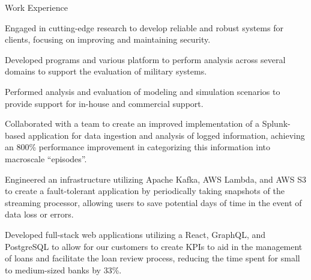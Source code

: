 \documentclass{resume} %
\begin{document}

\begin{workSection}{Work Experience}
    \experienceItem[
        company=Georgia Tech Research Institute (GTRI),
        location=Atlanta{,} GA,
        position=Graduate Research Assistant --- Clearance: Secret,
        duration=May 2024\textendash{Present}
    ]
    \begin{bullets}
        \item Engaged in cutting-edge research to develop reliable and robust systems for clients, focusing on improving and maintaining security.
        \item Developed programs and various platform to perform analysis across several domains to support the evaluation of military systems.
        \item Performed analysis and evaluation of modeling and simulation scenarios to provide support for in-house and commercial support.
    \end{bullets}
    
    \experienceItem[
        company=Splunk,
        location=San Jose{,} CA,
        position=Backend Software Engineer Intern,
        duration=May 2023\textendash{July 2023}
    ]
    \begin{bullets}
        \item Collaborated with a team to create an improved implementation of a Splunk-based application for data ingestion and analysis of logged information, achieving an 800\% performance improvement in categorizing this information into macroscale ``episodes''.
        \item Engineered an infrastructure utilizing Apache Kafka, AWS Lambda, and AWS S3 to create a fault-tolerant application by periodically taking snapshots of the streaming processor, allowing users to save potential days of time in the event of data loss or errors.
    \end{bullets}
     
    \experienceItem[
        company=QwickRate,
        location=Marietta{,} GA (Remote),
        position=Software Engineer Intern,
        duration=August 2022\textendash{April 2023}
    ]
    \begin{bullets}
        \item Developed full-stack web applications utilizing a React, GraphQL, and PostgreSQL to allow for our customers to create KPIs to aid in the management of loans and facilitate the loan review process, reducing the time spent for small to medium-sized banks by 33\%.
    \end{bullets}


\end{workSection}
\end{document}
